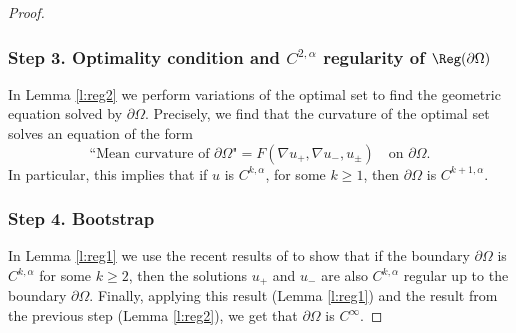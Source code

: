 \begin{proof}
\subsubsection*{Step 3. Optimality condition and $C^{2,\alpha}$ regularity of $ \Reg(\partial\Omega)$} In Lemma \ref{l:reg2} we perform variations of the optimal set to find the geometric equation solved by $\partial\Omega$. Precisely, we find that the curvature of the optimal set solves an equation of the form
\[\text{``Mean curvature of $\partial\Omega$"}=F(\nabla u_+,\nabla u_-,u_\pm)\quad\text{on } \partial\Omega.\]
In particular, this implies that if $u$ is $C^{k,\alpha}$, for some $k\ge 1$, then $\partial\Omega$ is $C^{k+1,\alpha}$.

\subsubsection*{Step 4. Bootstrap} In Lemma \ref{l:reg1} we use the recent results of \cite{D} to show that if the boundary $\partial\Omega$ is $C^{k,\alpha}$ for some $k\ge 2$, then the solutions $u_+$ and $u_-$ are also $C^{k,\alpha}$ regular up to the boundary $\partial\Omega$. Finally, applying this result (Lemma \ref{l:reg1}) and the result from the previous step (Lemma \ref{l:reg2}), we get that $\partial\Omega$ is $C^\infty$.
\end{proof}


